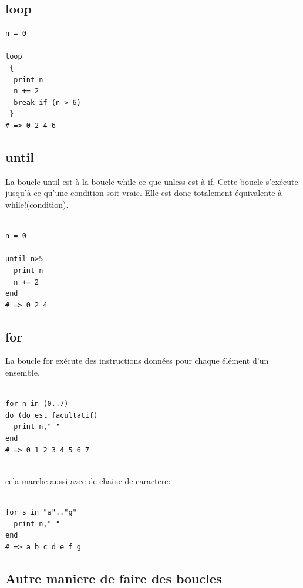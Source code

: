 \documentclass[a4paper,12pt,openany]{book}
\begin{document}
\subsection{loop}
\begin{verbatim}
n = 0

loop
 {
  print n
  n += 2
  break if (n > 6)
 }
# => 0 2 4 6
\end{verbatim}


\subsection{until}

La boucle until est à la boucle while ce que unless est à if. Cette boucle s'exécute jusqu'à ce qu'une condition soit vraie. Elle est donc totalement équivalente à while!(condition). \\
\\
\begin{verbatim}
n = 0

until n>5
  print n
  n += 2
end
# => 0 2 4
\end{verbatim}


\subsection{for}

La boucle for exécute des instructions données pour chaque élément d'un ensemble.\\
\\
\begin{verbatim}
for n in (0..7)
do (do est facultatif)
  print n," "
end
# => 0 1 2 3 4 5 6 7
\end{verbatim}
\\
cela marche aussi avec de chaine de caractere:\\
\\
\begin{verbatim}
for s in "a".."g"
  print n," "
end
# => a b c d e f g
\end{verbatim}


\subsection{Autre maniere de faire des boucles}
\end{document}
